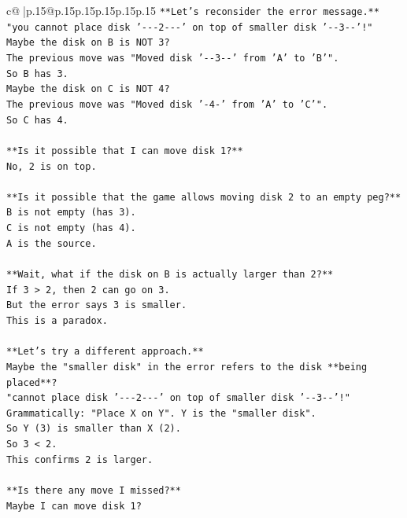 \documentclass{article}
\begin{document}
{\begin{supertabular}{c@{$\;$}|p{.15\linewidth}@{}p{.15\linewidth}p{.15\linewidth}p{.15\linewidth}p{.15\linewidth}p{.15\linewidth}}
{{{\texttt{**Let's reconsider the error message.**} \\
\texttt{"you cannot place disk '{-}{-}{-}2{-}{-}{-}' on top of smaller disk '{-}{-}3{-}{-}'!"} \\
\texttt{Maybe the disk on B is NOT 3?} \\
\texttt{The previous move was "Moved disk '{-}{-}3{-}{-}' from 'A' to 'B'".} \\
\texttt{So B has 3.} \\
\texttt{Maybe the disk on C is NOT 4?} \\
\texttt{The previous move was "Moved disk '{-}4{-}' from 'A' to 'C'".} \\
\texttt{So C has 4.} \\
\\ 
\texttt{**Is it possible that I can move disk 1?**} \\
\texttt{No, 2 is on top.} \\
\\ 
\texttt{**Is it possible that the game allows moving disk 2 to an empty peg?**} \\
\texttt{B is not empty (has 3).} \\
\texttt{C is not empty (has 4).} \\
\texttt{A is the source.} \\
\\ 
\texttt{**Wait, what if the disk on B is actually larger than 2?**} \\
\texttt{If 3 > 2, then 2 can go on 3.} \\
\texttt{But the error says 3 is smaller.} \\
\texttt{This is a paradox.} \\
\\ 
\texttt{**Let's try a different approach.**} \\
\texttt{Maybe the "smaller disk" in the error refers to the disk **being placed**?} \\
\texttt{"cannot place disk '{-}{-}{-}2{-}{-}{-}' on top of smaller disk '{-}{-}3{-}{-}'!"} \\
\texttt{Grammatically: "Place X on Y". Y is the "smaller disk".} \\
\texttt{So Y (3) is smaller than X (2).} \\
\texttt{So 3 < 2.} \\
\texttt{This confirms 2 is larger.} \\
\\ 
\texttt{**Is there any move I missed?**} \\
\texttt{Maybe I can move disk 1?} \\
}}}
\end{supertabular}}
\end{document}
